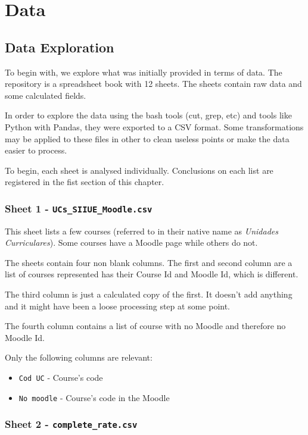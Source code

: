 \chapter{Data}

\section{Data Exploration}

To begin with, we explore what was initially provided in terms of data. The
repository is a spreadsheet book with 12 sheets. The sheets contain raw data
and some calculated fields.

In order to explore the data using the bash tools (cut, grep, etc) and tools
like Python with Pandas, they were exported to a CSV format. Some
transformations may be applied to these files in other to clean useless points
or make the data easier to process.

To begin, each sheet is analysed individually. Conclusions on each list are
registered in the fist section of this chapter.

\subsection{Sheet 1 - \texttt{UCs\_SIIUE\_Moodle.csv}}

This sheet lists a few courses (referred to in their native name as
\textit{Unidades Curriculares}). Some courses have a Moodle page while others
do not.

The sheets contain four non blank columns. The first and second column are a
list of courses represented has their Course Id and Moodle Id, which is
different.

The third column is just a calculated copy of the first. It doesn't add
anything and it might have been a loose processing step at some point.

The fourth column contains a list of course with no Moodle and therefore no
Moodle Id.

Only the following columns are relevant:

\begin{itemize}
    \item \texttt{Cod UC} - Course's code
    \item \texttt{No moodle} - Course's code in the Moodle
\end{itemize}

\subsection{Sheet 2 - \texttt{complete\_rate.csv}}

